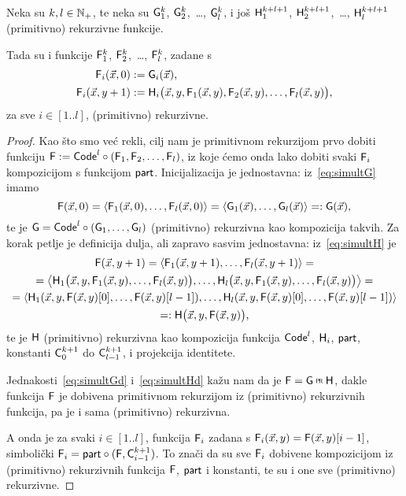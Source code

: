 \begin{propozicija}\label{prop:simultrek}
Neka su $k,l\in{\mathbb N}_+$, te neka su $\mathsf G_1^k$, $\mathsf G_2^k$,~\ldots, $\mathsf G_l^k$, i još $\mathsf H_1^{k+l+1}$, $\mathsf H_2^{k+l+1}$,~\ldots, $\mathsf H_l^{k+l+1}$ (primitivno) rekurzivne funkcije.

Tada su i funkcije $\mathsf F_1^k$, $\mathsf F_2^k$,~\ldots, $\mathsf F_l^k$, zadane s
\begin{align}
    \label{eq:simultG}\mathsf F_i(\vec x,0)&:=\mathsf G_i(\vec x)\text,\\
    \label{eq:simultH}
    \mathsf F_i(\vec x,y+1)&:=\mathsf H_i\bigl(\vec x,y,\mathsf F_1(\vec x,y),\mathsf F_2(\vec x,y),\dotsc,\mathsf F_l(\vec x,y)\bigr)\text,
\end{align}
za sve $i\in[1..l]$, (primitivno) rekurzivne.
\end{propozicija}
\begin{proof}
Kao što smo već rekli, cilj nam je primitivnom rekurzijom prvo dobiti funkciju $\mathsf F:=\mathsf{Code}^l\circ(\mathsf F_1,\mathsf F_2,\dotsc,\mathsf F_l)$, iz koje ćemo onda lako dobiti svaki $\mathsf F_i$ kompozicijom s funkcijom $\mathsf{part}$. Inicijalizacija je jednostavna: iz~\eqref{eq:simultG} imamo
\begin{equation}\label{eq:simultGd}
    \mathsf F(\vec x,0)=\langle \mathsf F_1(\vec x,0),\dotsc,\mathsf F_l(\vec x,0)\rangle=\langle \mathsf G_1(\vec x),\dotsc,\mathsf G_l(\vec x)\rangle=:\mathsf G(\vec x)\text,
\end{equation}
te je $\mathsf G=\mathsf{Code}^l\circ(\mathsf G_1,\dotsc,\mathsf G_l)$ (primitivno) rekurzivna kao kompozicija takvih. Za korak petlje je definicija dulja, ali zapravo sasvim jednostavna: iz~\eqref{eq:simultH} je
\begin{multline}\label{eq:simultHd}
\mathsf F(\vec x,y+1)=\langle\mathsf F_1(\vec x,y+1),\dotsc,\mathsf F_l(\vec x,y+1)\rangle=\\
=\bigl\langle\mathsf H_1\bigl(\vec x,y,\mathsf F_1(\vec x,y),\dotsc,\mathsf F_l(\vec x,y)\bigr),\dotsc,\mathsf H_l\bigl(\vec x,y,\mathsf F_1(\vec x,y),\dotsc,\mathsf F_l(\vec x,y)\bigr)\bigr\rangle=\\
=\langle
\mathsf H_1(\vec x,y,
\mathsf F(\vec x,y)[0],
\dotsc,
\mathsf F(\vec x,y)[l-1]),
\dotsc,
\mathsf H_l(\vec x,y,
\mathsf F(\vec x,y)[0],
\dotsc,
\mathsf F(\vec x,y)[l-1])\rangle\\
=:\mathsf H\bigl(\vec x,y,\mathsf F(\vec x,y)\bigr)\text,
\end{multline}
te je $\mathsf H$ (primitivno) rekurzivna kao kompozicija funkcija $\mathsf{Code}^l$, $\mathsf H_i$, $\mathsf{part}$, konstanti $\mathsf C_0^{k+1}$ do $\mathsf C_{l-1}^{k+1}$, i projekcija identitete.

Jednakosti~\eqref{eq:simultGd} i~\eqref{eq:simultHd} kažu nam da je $\f F=\f G\pr\f H$, dakle funkcija $\mathsf F$ je dobivena primitivnom rekurzijom iz (primitivno) rekurzivnih funkcija, pa je i sama (primitivno) rekurzivna. 

A onda je za svaki $i\in[1..l]$, funkcija $\mathsf F_i$ zadana s $\mathsf F_i(\vec x, y)=\mathsf F(\vec x,y)[i-1]$, simbolički $\mathsf F_i=\mathsf{part}\circ(\mathsf F,\mathsf C_{i-1}^{k+1})$. To znači da su sve $\mathsf F_i$ dobivene kompozicijom iz (primitivno) rekurzivnih funkcija $\mathsf F$, $\mathsf{part}$ i konstanti, te su i one sve (primitivno) rekurzivne.
\end{proof}

